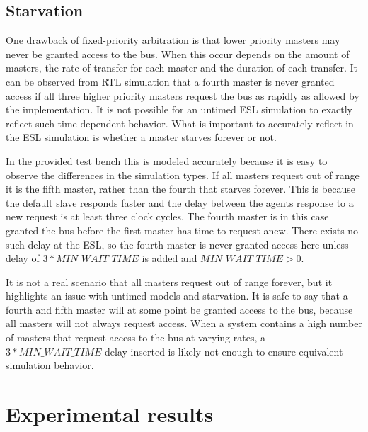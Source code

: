 \subsection{Starvation}
One drawback of fixed-priority arbitration is that lower priority masters may never be granted access to the bus. When this occur depends on the amount of masters, the rate of transfer for each master and the duration of each transfer. It can be observed from RTL simulation that a fourth master is never granted access if all three higher priority masters request the bus as rapidly as allowed by
the implementation. It is not possible for an untimed ESL simulation to exactly reflect such time dependent behavior. What is important to accurately reflect in the ESL simulation is whether a master starves forever or not. \par
In the provided test bench this is modeled accurately because it is easy to observe the differences in the simulation types. If all masters request out of range it is the fifth master, rather than the fourth that starves forever. This is because the default slave responds faster and the delay between the agents response to a new request is at least three clock cycles. The fourth master is in this case granted the bus before the first master has time to request anew. There exists no such delay at the ESL, so the fourth master is never granted access here unless delay of $3*MIN\_WAIT\_TIME$ is added and $MIN\_WAIT\_TIME>0$. \par
It is not a real scenario that all masters request out of range forever, but it highlights an issue with untimed models and starvation. It is safe to say that a fourth and fifth master will at some point be granted access to the bus, because all masters will not always request access. When a system contains a high number of masters that request access to the bus at varying rates, a $3*MIN\_WAIT\_TIME$ delay inserted is likely not enough to ensure equivalent simulation behavior. 


\section{Experimental results}
\label{sec:results}

